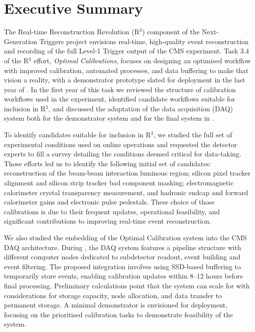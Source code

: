 \chapter{Executive Summary}

The Real-time Reconstruction Revolution (R$^3$) component of the Next-Generation Triggers project envisions real-time, high-quality event reconstruction and recording of the full Level-1 Trigger output of the CMS experiment.
Task 3.4 of the R$^3$ effort, \emph{Optimal Calibrations}, focuses on
designing an optimised workflow with improved calibration, automated processes, and data buffering to make that vision a reality,
with a demonstrator prototype slated for deployment in the last year of \Runthree.
In the first year of this task we 
reviewed the structure of calibration workflows used in the experiment, 
identified candidate workflows suitable for inclusion in R$^3$, and
discussed the adaptation of the data acquisition (DAQ) system both for the demonstrator system and
for the final system in \Phasetwo.

To identify candidates suitable for inclusion in R$^3$, 
we studied the full set of experimental conditions used on online operations and 
requested the detector experts to fill a survey detailing the conditions deemed critical for data-taking.
Those efforts led us to identify the following initial set of candidates:
reconstruction of the beam-beam interaction luminous region;
silicon pixel tracker alignment and
silicon strip tracker bad component masking;
electromagnetic calorimeter crystal transparency measurement, 
and
hadronic endcap and forward calorimeter gains and electronic pulse pedestals.
These choice of those calibrations is due to their frequent updates, 
operational feasibility, 
and significant contributions to improving real-time event reconstruction.

We also studied the embedding of the Optimal Calibration system into the CMS DAQ architecture. 
During \Runthree, the DAQ system features a pipeline structure with different computer nodes dedicated to subdetector readout,
event building and
event filtering. 
The proposed integration involves using SSD-based buffering to temporarily store events, enabling calibration updates within 8--12 hours before final processing. 
Preliminary calculations point that the system can scale for \Phasetwo with considerations for storage capacity, node allocation, and data transfer to permanent storage. 
A minimal demonstrator is envisioned for deployment, focusing on the prioritised calibration tasks to demonstrate feasibility of the system.